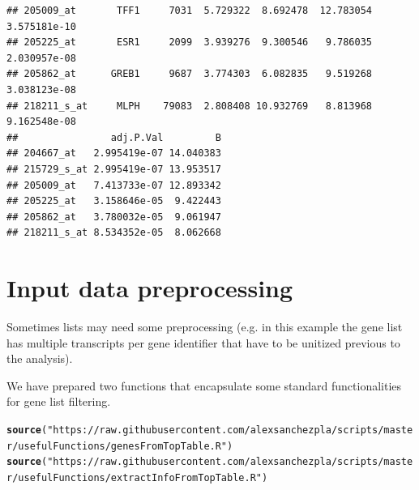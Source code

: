 \documentclass{article}\usepackage[]{graphicx}\usepackage[]{color}
\makeatletter
\newcommand{\hlstr}[1]{\textcolor[rgb]{0.192,0.494,0.8}{#1}}%
\newcommand{\hlstd}[1]{\textcolor[rgb]{0.345,0.345,0.345}{#1}}%
\newcommand{\hlkwd}[1]{\textcolor[rgb]{0.737,0.353,0.396}{\textbf{#1}}}%
\newenvironment{kframe}{%
 \def\at@end@of@kframe{}%
 \ifinner\ifhmode%
  \def\at@end@of@kframe{\end{minipage}}%
  \begin{minipage}{\columnwidth}%
 \fi\fi%
 \def\FrameCommand##1{\hskip\@totalleftmargin \hskip-\fboxsep
 \colorbox{shadecolor}{##1}\hskip-\fboxsep
     \hskip-\linewidth \hskip-\@totalleftmargin \hskip\columnwidth}%
 \MakeFramed {\advance\hsize-\width
   \@totalleftmargin\z@ \linewidth\hsize
   \@setminipage}}%
 {\par\unskip\endMakeFramed%
 \at@end@of@kframe}
\newenvironment{knitrout}{}{} %
\makeatother
\begin{document}
\begin{knitrout}
\begin{kframe}
\begin{verbatim}
## 205009_at       TFF1     7031  5.729322  8.692478  12.783054 3.575181e-10
## 205225_at       ESR1     2099  3.939276  9.300546   9.786035 2.030957e-08
## 205862_at      GREB1     9687  3.774303  6.082835   9.519268 3.038123e-08
## 218211_s_at     MLPH    79083  2.808408 10.932769   8.813968 9.162548e-08
##                adj.P.Val         B
## 204667_at   2.995419e-07 14.040383
## 215729_s_at 2.995419e-07 13.953517
## 205009_at   7.413733e-07 12.893342
## 205225_at   3.158646e-05  9.422443
## 205862_at   3.780032e-05  9.061947
## 218211_s_at 8.534352e-05  8.062668
\end{verbatim}
\end{kframe}
\end{knitrout}

\section{Input data preprocessing}

Sometimes lists may need some preprocessing (e.g. in this example the gene list has multiple transcripts per gene identifier that have to be unitized previous to the analysis).

We have prepared two functions that encapsulate some standard functionalities for gene list filtering.

\begin{knitrout}
\color{fgcolor}\begin{kframe}
\begin{alltt}
\hlkwd{source}\hlstd{(}\hlstr{"https://raw.githubusercontent.com/alexsanchezpla/scripts/master/usefulFunctions/genesFromTopTable.R"}\hlstd{)}
\hlkwd{source}\hlstd{(}\hlstr{"https://raw.githubusercontent.com/alexsanchezpla/scripts/master/usefulFunctions/extractInfoFromTopTable.R"}\hlstd{)}
\end{alltt}
\end{kframe}
\end{knitrout}
\end{document}
